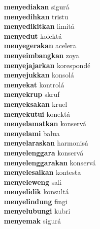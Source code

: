 \textbf{menyediakan } sigurá \\
\textbf{menyedihkan } tristu \\
\textbf{menyedikitkan } limitá \\
\textbf{menyedut } kolektá \\
\textbf{menyegerakan } acelera \\
\textbf{menyeimbangkan } zoya \\
\textbf{menyejajarkan } korespondé \\
\textbf{menyejukkan } konsolá \\
\textbf{menyekat } kontrolá \\
\textbf{menyekrup } skruf \\
\textbf{menyeksakan } kruel \\
\textbf{menyekutui } konektá \\
\textbf{menyelamatkan } konservá \\
\textbf{menyelami } balua \\
\textbf{menyelaraskan } harmonisá \\
\textbf{menyelenggara } konservá \\
\textbf{menyelenggarakan } konservá \\
\textbf{menyelesaikan } kontesta \\
\textbf{menyeleweng } sali \\
\textbf{menyelidik } konsultá \\
\textbf{menyelindung } fingi \\
\textbf{menyelubungi } kubri \\
\textbf{menyemak } sigurá \\
